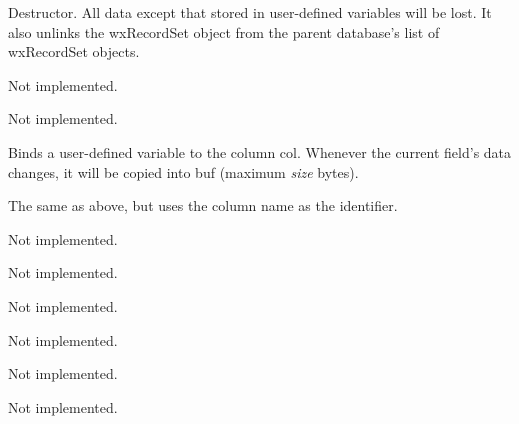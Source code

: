 Destructor. All data except that stored in user-defined variables will be lost.
It also unlinks the wxRecordSet object from the parent database's list of
wxRecordSet objects.
 


Not implemented.



Not implemented.



Binds a user-defined variable to the column col. Whenever the current field's
data changes, it will be copied into buf (maximum {\it size} bytes).


The same as above, but uses the column name as the identifier.



Not implemented.



Not implemented.



Not implemented.



Not implemented.



Not implemented.



Not implemented.

